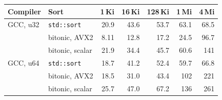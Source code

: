 \begin{tabular}{llrrrrr}
\toprule
Compiler & Sort & 1\,Ki & 16\,Ki & 128\,Ki & 1\,Mi & 4\,Mi\\
\midrule
GCC, u32 & \texttt{std::sort} & 20.9 & 43.6 & 53.7 & 63.1 & 68.5\\
 & bitonic, AVX2 & 8.11 & 12.8 & 17.2 & 24.5 & 96.7\\
 & bitonic, scalar & 21.9 & 34.4 & 45.7 & 60.6 & 141\\
\midrule
GCC, u64 & \texttt{std::sort} & 18.7 & 41.2 & 52.4 & 59.7 & 66.8\\
 & bitonic, AVX2 & 18.5 & 31.0 & 43.4 & 102 & 221\\
 & bitonic, scalar & 25.7 & 47.0 & 67.2 & 136 & 261\\
\midrule
\bottomrule
\end{tabular}
